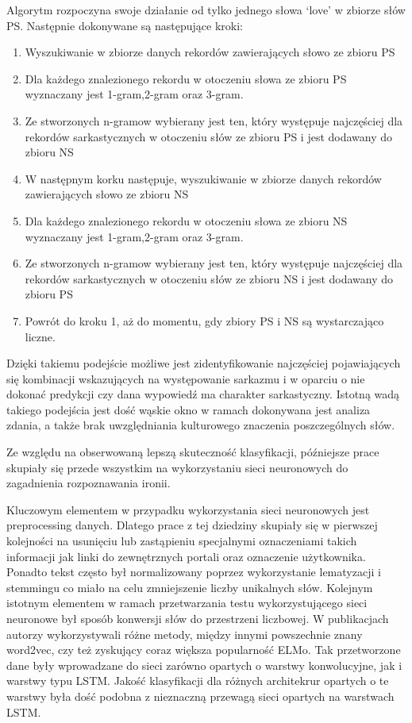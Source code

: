Algorytm rozpoczyna swoje działanie od tylko jednego słowa ‘love’ w zbiorze słów PS. Następnie dokonywane są następujące kroki:
\begin{enumerate}
    \item Wyszukiwanie w zbiorze danych rekordów zawierających słowo ze zbioru PS
    \item Dla każdego znalezionego rekordu w otoczeniu słowa ze zbioru PS wyznaczany jest 1-gram,2-gram oraz 3-gram.
    \item Ze stworzonych n-gramow wybierany jest ten, który występuje najczęściej dla rekordów sarkastycznych w otoczeniu słów ze zbioru PS i jest dodawany do zbioru NS
    \item W następnym korku następuje, wyszukiwanie w zbiorze danych rekordów zawierających słowo ze zbioru NS
    \item Dla każdego znalezionego rekordu w otoczeniu słowa ze zbioru NS wyznaczany jest 1-gram,2-gram oraz 3-gram.
    \item Ze stworzonych n-gramow wybierany jest ten, który występuje najczęściej dla rekordów sarkastycznych w otoczeniu słów ze zbioru NS i jest dodawany do zbioru PS
    \item Powrót do kroku 1, aż do momentu, gdy zbiory PS i NS są wystarczająco liczne.
\end{enumerate}




Dzięki takiemu podejście możliwe jest zidentyfikowanie najczęściej pojawiających się kombinacji wskazujących na występowanie sarkazmu i w oparciu o nie dokonać predykcji czy dana wypowiedź ma charakter sarkastyczny. Istotną wadą takiego podejścia jest dość wąskie okno w ramach dokonywana jest analiza zdania, a także brak uwzględniania kulturowego znaczenia poszczególnych słów.

Ze względu na obserwowaną lepszą skuteczność klasyfikacji, późniejsze prace skupiały się przede wszystkim na wykorzystaniu sieci neuronowych do zagadnienia rozpoznawania ironii.

Kluczowym elementem w przypadku wykorzystania sieci neuronowych jest preprocessing danych. Dlatego prace \cite{Baziotis2018}  \cite{Huang2017}  \cite{Ilic2018} z tej dziedziny skupiały się w pierwszej kolejności na usunięciu lub zastąpieniu specjalnymi oznaczeniami takich informacji jak linki do zewnętrznych portali oraz oznaczenie użytkownika. Ponadto tekst często był normalizowany poprzez wykorzystanie lematyzacji i stemmingu co miało na celu zmniejszenie liczby unikalnych słów. Kolejnym istotnym elementem w ramach przetwarzania testu wykorzystującego sieci neuronowe był sposób konwersji słów do przestrzeni liczbowej. W publikacjach autorzy wykorzystywali różne metody, między innymi powszechnie znany word2vec, czy też zyskujący coraz większa popularność ELMo. Tak przetworzone dane były wprowadzane do sieci zarówno opartych o warstwy konwolucyjne, jak i warstwy typu LSTM. Jakość klasyfikacji dla różnych architekrur opartych o te warstwy była dość podobna z nieznaczną przewagą sieci opartych na warstwach LSTM.



